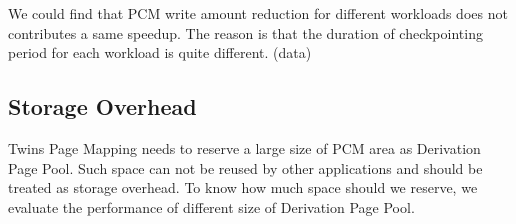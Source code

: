 \documentclass[conference]{IEEEtran}
\begin{document}
We could find that PCM write amount reduction for different workloads does not contributes a same speedup.
The reason is that the duration of checkpointing period for each workload is quite different. (data)



\subsection{Storage Overhead}\label{sec:evaluation_storage_overhead}

Twins Page Mapping needs to reserve a large size of PCM area as Derivation Page Pool.
Such space can not be reused by other applications and should be treated as storage overhead.
To know how much space should we reserve, we evaluate the performance of different size of Derivation Page Pool.




%
\end{document}
